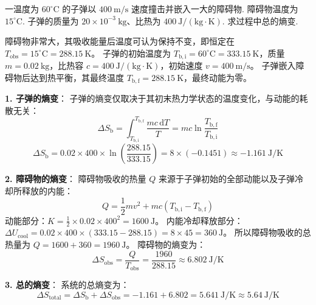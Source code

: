 \begin{exercise}\label{ex:12.8}
一温度为 $60^\circ\mathrm{C}$ 的子弹以 $400 \ \mathrm{m/s}$ 速度撞击并嵌入一大的障碍物. 障碍物温度为 $15^\circ\mathrm{C}$. 子弹的质量为 $20 \times 10^{-3} \ \mathrm{kg}$、比热为 $400 \ \mathrm{J/(kg \cdot K)}$. 求过程中总的熵变.
\end{exercise}
\begin{solution}
障碍物非常大，其吸收能量后温度可认为保持不变，即恒定在 $T_{\mathrm{obs}} = 15^\circ\mathrm{C} = 288.15 \ \mathrm{K}$。
子弹的初始温度为 $T_{\mathrm{b,i}} = 60^\circ\mathrm{C} = 333.15 \ \mathrm{K}$，质量 $m = 0.02 \ \mathrm{kg}$，比热容 $c = 400 \ \mathrm{J/(kg \cdot K)}$，初始速度 $v = 400 \ \mathrm{m/s}$。
子弹嵌入障碍物后达到热平衡，其最终温度 $T_{\mathrm{b,f}} = 288.15 \ \mathrm{K}$，最终动能为零。

\textbf{1. 子弹的熵变}：
子弹的熵变仅取决于其初末热力学状态的温度变化，与动能的耗散无关：
$$ \Delta S_{\mathrm{b}} = \int_{T_{\mathrm{b,i}}}^{T_{\mathrm{b,f}}} \frac{mc \, \mathrm{d}T}{T} = mc \ln\frac{T_{\mathrm{b,f}}}{T_{\mathrm{b,i}}} $$
$$ \Delta S_{\mathrm{b}} = 0.02 \times 400 \times \ln\left( \frac{288.15}{333.15} \right) = 8 \times (-0.1451) \approx -1.161 \ \mathrm{J/K} $$

\textbf{2. 障碍物的熵变}：
障碍物吸收的热量 $Q$ 来源于子弹初始的全部动能以及子弹冷却所释放的内能：
$$ Q = \frac{1}{2} m v^2 + mc(T_{\mathrm{b,i}} - T_{\mathrm{b,f}}) $$
动能部分：$K = \frac{1}{2} \times 0.02 \times 400^2 = 1600 \ \mathrm{J}$。
内能冷却释放部分：$\Delta U_{\mathrm{cool}} = 0.02 \times 400 \times (333.15 - 288.15) = 8 \times 45 = 360 \ \mathrm{J}$。
所以障碍物吸收的总热量为 $Q = 1600 + 360 = 1960 \ \mathrm{J}$。
障碍物的熵变为：
$$ \Delta S_{\mathrm{obs}} = \frac{Q}{T_{\mathrm{obs}}} = \frac{1960}{288.15} \approx 6.802 \ \mathrm{J/K} $$

\textbf{3. 总的熵变}：
系统的总熵变为：
$$ \Delta S_{\mathrm{total}} = \Delta S_{\mathrm{b}} + \Delta S_{\mathrm{obs}} = -1.161 + 6.802 = 5.641 \ \mathrm{J/K} \approx 5.64 \ \mathrm{J/K} $$
\end{solution}

